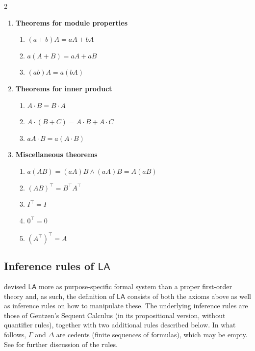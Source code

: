 \documentclass[11pt]{article}
\newcommand{\LA}{\mathsf{LA}}
\theoremstyle{definition}
\theoremstyle{plain}
\theoremstyle{remark}
\let\autocite\cite\let\textcite\citet
\begin{document}
\begin{multicols}{2}
\begin{enumerate}
\begin{enumerate}
        \item $A(B+C)=AB+CA$ 
        \item $(B+C)A=BA+CA$  
        \item $\Sigma 0 =0_{\text{field}}$
        \item $\Sigma(cA)=c\Sigma(A)$
        \item $\Sigma(A+B)=\Sigma(A)+\Sigma(B)$
        \item $\Sigma(A)=\Sigma(A^\intercal)$
    \end{enumerate}
    \item \textbf{Theorems for module properties}
    \begin{enumerate}
        \item $(a+b)A=aA+bA$ 
        \item $a(A+B)=aA+aB$ 
        \item $(ab)A=a(bA)$
    \end{enumerate}
    \item \textbf{Theorems for inner product}
    \begin{enumerate}
        \item $A\cdot B= B\cdot A$ 
        \item $A\cdot (B+C)=A\cdot B+ A\cdot C$ 
        \item $aA\cdot B=a(A\cdot B)$
    \end{enumerate}
    \item \textbf{Miscellaneous theorems}
    \begin{enumerate}
        \item $a(AB)=(aA)B\wedge (aA)B=A(aB)$
        \item $(AB)^\intercal=B^\intercal A^\intercal$
        \item $I^\intercal=I$
        \item $0^\intercal=0$
        \item $(A^\intercal)^\intercal=A$ 
    \end{enumerate}
\end{enumerate}
\end{multicols}

\subsection{Inference rules of $\LA$}
\label{app:inf-rules}
\citeauthor{cooksoltys} devised $\LA$ more as purpose-specific formal system than a proper first-order theory and, as such, the definition of $\LA$ consists of both the axioms above as well as inference rules on how to manipulate these. The underlying inference rules are those of Gentzen's Sequent Calculus (in its propositional version, without quantifier rules), together with two additional rules described below. In what follows, $\Gamma$ and $\Delta$ are cedents (finite sequences of formulas), which may be empty. See \autocite[Section 2.2]{cooksoltys} for further discussion of the rules.
\end{document}
